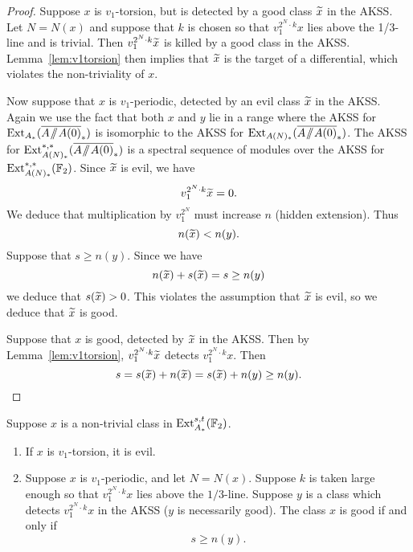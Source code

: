 \begin{proof}
Suppose $x$ is $v_1$-torsion, but is detected by a good class $\widetilde{x}$ in the AKSS.  Let $N = N(x)$ and suppose that $k$ is chosen so that $v_1^{2^N\cdot k} x$ lies above the 1/3-line and is trivial.  Then 
$v_1^{2^N\cdot k} \widetilde{x}$ is killed by a good class in the AKSS.  Lemma~\ref{lem:v1torsion} then implies that $\widetilde{x}$ is the target of a differential, which violates the non-triviality of $x$.  

Now suppose that $x$ is $v_1$-periodic, detected by an evil class $\widetilde{x}$ in the AKSS.  Again we use the fact that both $x$ and $y$ lie in a range where the AKSS for $\Ext_{A_*}(\AA0)$ is isomorphic to the AKSS for $\Ext_{A(N)_*}(\AA0)$.
The AKSS for $\Ext^{*,*}_{A(N)_*}(\AA0)$ is a spectral sequence of modules over the AKSS for $\operatorname{Ext}^{*,*}_{A(N)_*}(\mathbb{F}_2)$. Since $\widetilde{x}$ is evil, we have  
\[ v_1^{2^N \cdot k}\widetilde{x}  = 0. \]
We deduce that multiplication by $v_1^{2^N}$ must increase $n$ (hidden extension).  Thus
$$ n(\widetilde{x}) < n(y). $$
Suppose that 
$s \ge n(y).$  Since we have
$$ n(\widetilde{x})+s(\widetilde{x}) = s \ge n(y) $$
we deduce that $s(\widetilde{x}) > 0$.  This violates the assumption that $\widetilde{x}$ is evil, so we deduce that $\widetilde{x}$ is good.

Suppose that $x$ is good, detected by $\widetilde{x}$ in the AKSS.  Then by Lemma~\ref{lem:v1torsion}, $v_1^{2^N\cdot k}\widetilde{x}$ detects $v_1^{2^N\cdot k}x$.  
Then
$$ s = s(\widetilde{x}) + n(\widetilde{x}) = s(\widetilde{x}) + n(y) \ge n(y). $$
\end{proof}

\begin{thm}\label{thm:dichotomy}
Suppose $x$ is a non-trivial class in $\operatorname{Ext}^{s,t}_{A_*}(\mathbb{F}_2)$.
\begin{enumerate}
\item
If $x$ is $v_1$-torsion, it is evil.

\item 
Suppose $x$ is $v_1$-periodic, and let $N = N(x)$.  Suppose $k$ is taken large enough so that  $v_1^{2^N\cdot k} x$ lies above the $1/3$-line.  Suppose $y$ is a class
which detects $v_1^{2^N\cdot k} x$ in the AKSS ($y$ is necessarily good).  The class $x$ is good if and only if 
$$ s \ge n(y). $$
\end{enumerate}
\end{thm}

